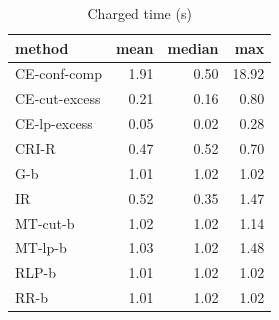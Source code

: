 \begin{table}[htbp]
\centering
\small
\caption{Charged time (s)}
\label{tab:E2b_head_to_head_budgets_b1_time}
\begin{tabular}{lrrr}
\toprule
method & mean & median & max \\
\midrule
CE-conf-comp & 1.91 & 0.50 & 18.92 \\
CE-cut-excess & 0.21 & 0.16 & 0.80 \\
CE-lp-excess & 0.05 & 0.02 & 0.28 \\
CRI-R & 0.47 & 0.52 & 0.70 \\
G-b & 1.01 & 1.02 & 1.02 \\
IR & 0.52 & 0.35 & 1.47 \\
MT-cut-b & 1.02 & 1.02 & 1.14 \\
MT-lp-b & 1.03 & 1.02 & 1.48 \\
RLP-b & 1.01 & 1.02 & 1.02 \\
RR-b & 1.01 & 1.02 & 1.02 \\
\bottomrule
\end{tabular}
\end{table}
